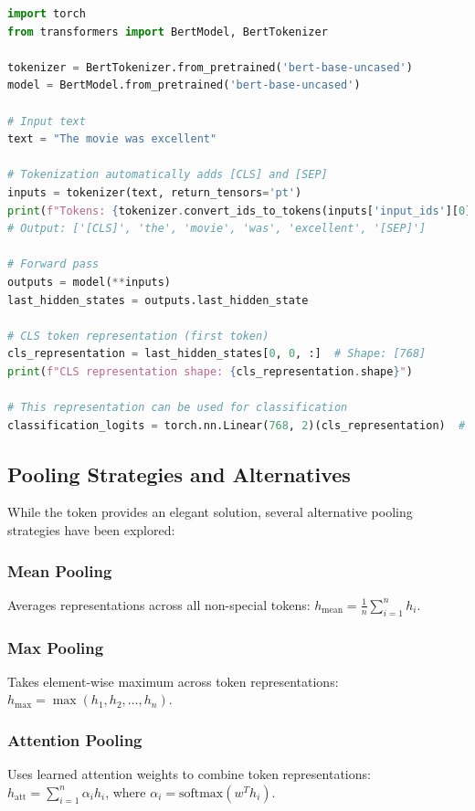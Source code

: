 \begin{lstlisting}[language=Python, caption=CLS Token Processing]
import torch
from transformers import BertModel, BertTokenizer

tokenizer = BertTokenizer.from_pretrained('bert-base-uncased')
model = BertModel.from_pretrained('bert-base-uncased')

# Input text
text = "The movie was excellent"

# Tokenization automatically adds [CLS] and [SEP]
inputs = tokenizer(text, return_tensors='pt')
print(f"Tokens: {tokenizer.convert_ids_to_tokens(inputs['input_ids'][0])}")
# Output: ['[CLS]', 'the', 'movie', 'was', 'excellent', '[SEP]']

# Forward pass
outputs = model(**inputs)
last_hidden_states = outputs.last_hidden_state

# CLS token representation (first token)
cls_representation = last_hidden_states[0, 0, :]  # Shape: [768]
print(f"CLS representation shape: {cls_representation.shape}")

# This representation can be used for classification
classification_logits = torch.nn.Linear(768, 2)(cls_representation)  # Binary classification
\end{lstlisting}

\subsection{Pooling Strategies and Alternatives}

While the \cls{} token provides an elegant solution, several alternative pooling strategies have been explored:

\subsubsection{Mean Pooling}
Averages representations across all non-special tokens:
$h_{\text{mean}} = \frac{1}{n} \sum_{i=1}^{n} h_i$.

\subsubsection{Max Pooling}
Takes element-wise maximum across token representations:
$h_{\text{max}} = \max(h_1, h_2, \ldots, h_n)$.

\subsubsection{Attention Pooling}
Uses learned attention weights to combine token representations:
$h_{\text{att}} = \sum_{i=1}^{n} \alpha_i h_i$, where $\alpha_i = \text{softmax}(w^T h_i)$.

